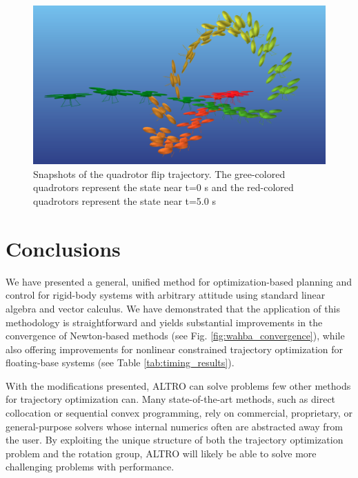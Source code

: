 \documentclass[letterpaper, 10 pt, conference]{ieeeconf}  %
\begin{document}
        \begin{figure}[t]
            \centering
            \includegraphics[width=\columnwidth]{figures/quadflip.png}
            \caption{Snapshots of the quadrotor flip trajectory. The
                gree-colored quadrotors represent the state near t=0 s and the
                red-colored quadrotors represent the state near t=5.0 s
            }
            \label{fig:quad_flip}
        \end{figure}    
    

\section{Conclusions} \label{sec:conclusion}
    We have presented a general, unified method for optimization-based planning and control for rigid-body
    systems with arbitrary attitude using standard linear algebra and vector calculus.
    We have demonstrated that the application of this methodology is straightforward and
    yields substantial improvements in the convergence of Newton-based methods (see Fig. 
    \ref{fig:wahba_convergence}), while also offering improvements for nonlinear constrained
    trajectory optimization for floating-base systems (see Table \ref{tab:timing_results}).
    
    With the modifications presented, ALTRO can solve problems few other methods for 
    trajectory optimization can. Many state-of-the-art methods, such as direct 
    collocation or sequential convex programming, rely on commercial, proprietary, or 
    general-purpose solvers whose internal numerics often are abstracted away from the user. 
    By exploiting the unique structure of both the trajectory optimization problem
    and the rotation group, ALTRO will likely be able to solve more challenging problems with performance. 
\end{document}
